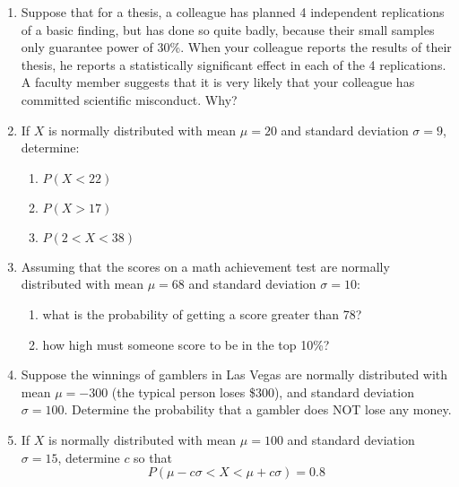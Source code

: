 \documentclass[10pt]{article}
\begin{document}
\begin{enumerate}
\item Suppose that for a thesis, a colleague has planned 4 independent replications of a basic finding, but has done so quite badly, because their small samples only guarantee power of 30\%.  When your colleague reports the results of their thesis, he reports a statistically significant effect in each of the 4 replications.  A faculty member suggests that it is very likely that your colleague has committed scientific misconduct.  Why?

\item If $X$ is normally distributed with mean $\mu=20$ and standard deviation $\sigma=9$, determine:
  \begin{enumerate}
  \item $P(X<22)$
  \item $P(X>17)$
    \item $P(2<X<38)$
  \end{enumerate}

\item Assuming that the scores on a math achievement test are normally distributed with mean $\mu=68$ and standard deviation $\sigma=10$:

  \begin{enumerate}
  \item what is the probability of getting a score greater than 78?
  \item how high must someone score to be in the top 10\%?
  \end{enumerate}
  
\item Suppose the winnings of gamblers in Las Vegas are normally distributed with mean $\mu=-300$ (the typical person loses \$300), and standard deviation $\sigma = 100$.  Determine the probability that a gambler does NOT lose any money.

\item If $X$ is normally distributed with mean $\mu=100$ and standard deviation $\sigma = 15$, determine $c$ so that
  \[
    P(\mu-c\sigma < X < \mu+c\sigma) = 0.8
  \]

 
\end{enumerate}
\end{document}

